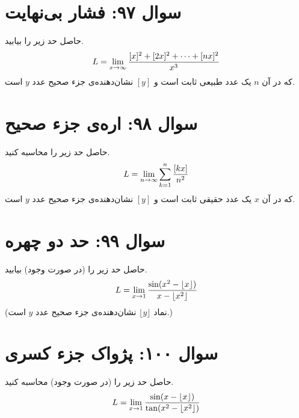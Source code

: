 \documentclass[12pt]{article}
\begin{document}
\section*{سوال ۹۷: فشار بی‌نهایت}
حاصل حد زیر را بیابید.
\begin{displaymath}
	\Large L = \lim_{x \to \infty} \frac{[x]^2 + [2x]^2 + \dots + [nx]^2}{x^3}
\end{displaymath}
که در آن \(n\) یک عدد طبیعی ثابت است و \( [y] \) نشان‌دهنده‌ی جزء صحیح عدد \(y\) است.


\vspace{1cm}
\hrulefill
\vspace{1cm}

\section*{سوال ۹۸: اره‌ی جزء صحیح}
حاصل حد زیر را محاسبه کنید.
\begin{displaymath}
	\Large L = \lim_{n \to \infty} \sum_{k=1}^{n} \frac{[kx]}{n^2}
\end{displaymath}
که در آن \(x\) یک عدد حقیقی ثابت است و \( [y] \) نشان‌دهنده‌ی جزء صحیح عدد \(y\) است.

\section*{سوال ۹۹: حد دو چهره}
حاصل حد زیر را (در صورت وجود) بیابید.
\begin{displaymath}
	\Large L = \lim_{x \to 1} \frac{\sin(x^2 - \lfloor x \rfloor)}{x - \lfloor x^2 \rfloor}
\end{displaymath}
(نماد \( \lfloor y \rfloor \) نشان‌دهنده‌ی جزء صحیح عدد \(y\) است.)

\vspace{1cm}
\hrulefill
\vspace{1cm}

\section*{سوال ۱۰۰: پژواک جزء کسری}
حاصل حد زیر را (در صورت وجود) محاسبه کنید.
\begin{displaymath}
	\Large L = \lim_{x \to 1} \frac{\sin(x - \lfloor x \rfloor)}{\tan(x^2 - \lfloor x^2 \rfloor)}
\end{displaymath}
\end{document}
